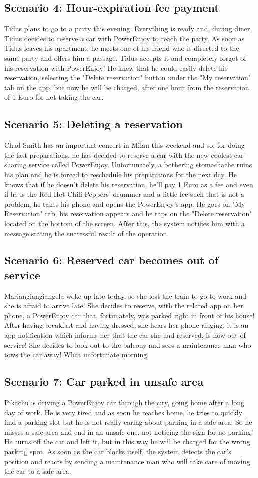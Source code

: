 \documentclass[10pt, a4paper,titlepage]{article}
\begin{document}
\subsection{Scenario 4: Hour-expiration fee payment}
Tidus plans to go to a party this evening. Everything is ready and, during diner, Tidus decides to reserve a car with PowerEnjoy to reach the party.
As soon as Tidus leaves his apartment, he meets one of his friend who is directed to the same party and offers him a passage. Tidus accepts it and completely forgot of his reservation with PowerEnjoy!  He knew that he could easily delete his reservation, selecting the "Delete reservation" button under the "My reservation" tab on the app, but now he will be charged, after one hour from the reservation, of 1 Euro for not taking the car.
\subsection{Scenario 5: Deleting a reservation}
Chad Smith has an important concert in Milan this weekend and so, for doing the last preparations, he has decided to reserve a car with the new coolest car-sharing service called PowerEnjoy. 
Unfortunately, a bothering stomachache ruins his plan and he is forced to reschedule his preparations for the next day. He knows that if he doesn't delete his reservation, he'll pay 1 Euro as a fee and even if he is the Red Hot Chili Peppers' drummer and a little fee such that is not a problem, he takes his phone and opens the PowerEnjoy's app. He goes on "My Reservation" tab, his reservation appears and he taps on the "Delete reservation" located on the bottom of the screen. After this, the system notifies him with a message stating the successful result of the operation.
\subsection{Scenario 6: Reserved car becomes out of service}
Mariangiangiangela woke up late today, so she lost the train to go to work and she is afraid to arrive late! She decides to reserve, with the related app on her phone, a PowerEnjoy car that, fortunately, was parked right in front of his house! 
After having breakfast and having dressed, she hears her phone ringing, it is an app-notification which informs her that the car she had reserved, is now out of service! She decides to look out to the balcony and sees a maintenance man who tows the car away! What unfortunate morning.
\subsection{Scenario 7: Car parked in unsafe area}
Pikachu is driving a PowerEnjoy car through the city, going home after a long day of work. He is very tired and as soon he reaches home, he tries to quickly find a parking slot but he is not really caring about parking in a safe area.
So he misses a safe area and end in an unsafe one, not noticing the sign for no parking! He turns off the car and left it, but in this way he will be charged for the wrong parking spot.
As soon as the car blocks itself, the system detects the car's position and reacts by sending a maintenance man who will take care of moving the car to a safe area.
\end{document}
